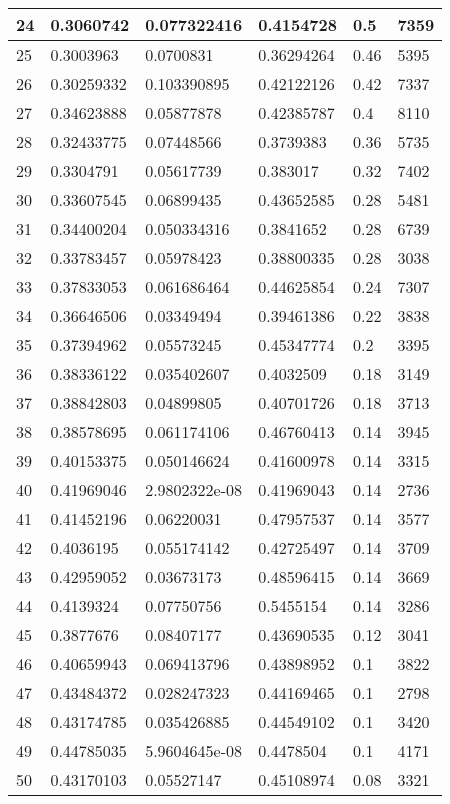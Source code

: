 \begin{longtable}{|l|l|l|l|l|l|}
24 & 0.3060742 & 0.077322416 & 0.4154728 & 0.5 & 7359 \\ \hline 
25 & 0.3003963 & 0.0700831 & 0.36294264 & 0.46 & 5395 \\ \hline 
26 & 0.30259332 & 0.103390895 & 0.42122126 & 0.42 & 7337 \\ \hline 
27 & 0.34623888 & 0.05877878 & 0.42385787 & 0.4 & 8110 \\ \hline 
28 & 0.32433775 & 0.07448566 & 0.3739383 & 0.36 & 5735 \\ \hline 
29 & 0.3304791 & 0.05617739 & 0.383017 & 0.32 & 7402 \\ \hline 
30 & 0.33607545 & 0.06899435 & 0.43652585 & 0.28 & 5481 \\ \hline 
31 & 0.34400204 & 0.050334316 & 0.3841652 & 0.28 & 6739 \\ \hline 
32 & 0.33783457 & 0.05978423 & 0.38800335 & 0.28 & 3038 \\ \hline 
33 & 0.37833053 & 0.061686464 & 0.44625854 & 0.24 & 7307 \\ \hline 
34 & 0.36646506 & 0.03349494 & 0.39461386 & 0.22 & 3838 \\ \hline 
35 & 0.37394962 & 0.05573245 & 0.45347774 & 0.2 & 3395 \\ \hline 
36 & 0.38336122 & 0.035402607 & 0.4032509 & 0.18 & 3149 \\ \hline 
37 & 0.38842803 & 0.04899805 & 0.40701726 & 0.18 & 3713 \\ \hline 
38 & 0.38578695 & 0.061174106 & 0.46760413 & 0.14 & 3945 \\ \hline 
39 & 0.40153375 & 0.050146624 & 0.41600978 & 0.14 & 3315 \\ \hline 
40 & 0.41969046 & 2.9802322e-08 & 0.41969043 & 0.14 & 2736 \\ \hline 
41 & 0.41452196 & 0.06220031 & 0.47957537 & 0.14 & 3577 \\ \hline 
42 & 0.4036195 & 0.055174142 & 0.42725497 & 0.14 & 3709 \\ \hline 
43 & 0.42959052 & 0.03673173 & 0.48596415 & 0.14 & 3669 \\ \hline 
44 & 0.4139324 & 0.07750756 & 0.5455154 & 0.14 & 3286 \\ \hline 
45 & 0.3877676 & 0.08407177 & 0.43690535 & 0.12 & 3041 \\ \hline 
46 & 0.40659943 & 0.069413796 & 0.43898952 & 0.1 & 3822 \\ \hline 
47 & 0.43484372 & 0.028247323 & 0.44169465 & 0.1 & 2798 \\ \hline 
48 & 0.43174785 & 0.035426885 & 0.44549102 & 0.1 & 3420 \\ \hline 
49 & 0.44785035 & 5.9604645e-08 & 0.4478504 & 0.1 & 4171 \\ \hline 
50 & 0.43170103 & 0.05527147 & 0.45108974 & 0.08 & 3321 \\ \hline 
\end{longtable}